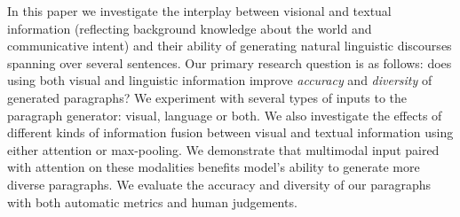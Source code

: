 \documentclass[11pt,a4paper]{article}
\begin{document}
In this paper we investigate the interplay between visional and textual information (reflecting background knowledge about the world and communicative intent) and their ability of generating natural linguistic discourses spanning over several sentences.
Our primary research question is as follows: does %
using both visual and linguistic information improve \emph{accuracy} and \emph{diversity} of generated paragraphs?
We experiment with several types of inputs to the paragraph generator: visual, language or both.
We also investigate the effects of different kinds of information fusion between visual and textual information using either attention or max-pooling. %
We demonstrate that multimodal input paired with attention on these modalities benefits model's ability to generate more diverse paragraphs. %
We evaluate the accuracy and diversity of our paragraphs with both automatic metrics and human judgements.


\end{document}
